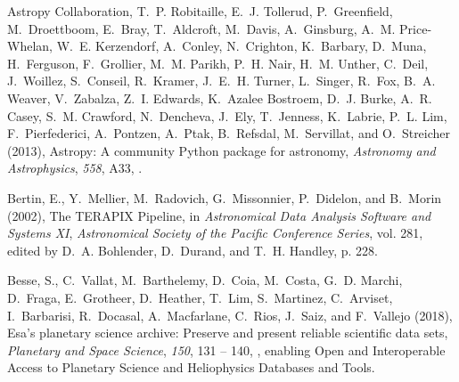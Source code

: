 \begin{thebibliography}{22}
{Astropy Collaboration}, T.~P. {Robitaille}, E.~J. {Tollerud}, P.~{Greenfield},
  M.~{Droettboom}, E.~{Bray}, T.~{Aldcroft}, M.~{Davis}, A.~{Ginsburg}, A.~M.
  {Price-Whelan}, W.~E. {Kerzendorf}, A.~{Conley}, N.~{Crighton}, K.~{Barbary},
  D.~{Muna}, H.~{Ferguson}, F.~{Grollier}, M.~M. {Parikh}, P.~H. {Nair}, H.~M.
  {Unther}, C.~{Deil}, J.~{Woillez}, S.~{Conseil}, R.~{Kramer}, J.~E.~H.
  {Turner}, L.~{Singer}, R.~{Fox}, B.~A. {Weaver}, V.~{Zabalza}, Z.~I.
  {Edwards}, K.~{Azalee Bostroem}, D.~J. {Burke}, A.~R. {Casey}, S.~M.
  {Crawford}, N.~{Dencheva}, J.~{Ely}, T.~{Jenness}, K.~{Labrie}, P.~L. {Lim},
  F.~{Pierfederici}, A.~{Pontzen}, A.~{Ptak}, B.~{Refsdal}, M.~{Servillat}, and
  O.~{Streicher} (2013), {Astropy: A community Python package for astronomy},
  \textit{Astronomy and Astrophysics}, \textit{558}, A33,
  .

{Bertin}, E., Y.~{Mellier}, M.~{Radovich}, G.~{Missonnier}, P.~{Didelon}, and
  B.~{Morin} (2002), {The TERAPIX Pipeline}, in \textit{Astronomical Data
  Analysis Software and Systems XI}, \textit{Astronomical Society of the
  Pacific Conference Series}, vol. 281, edited by D.~A. {Bohlender},
  D.~{Durand}, and T.~H. {Handley}, p. 228.

Besse, S., C.~Vallat, M.~Barthelemy, D.~Coia, M.~Costa, G.~D. Marchi, D.~Fraga,
  E.~Grotheer, D.~Heather, T.~Lim, S.~Martinez, C.~Arviset, I.~Barbarisi,
  R.~Docasal, A.~Macfarlane, C.~Rios, J.~Saiz, and F.~Vallejo (2018), Esa's
  planetary science archive: Preserve and present reliable scientific data
  sets, \textit{Planetary and Space Science}, \textit{150}, 131 -- 140,
  , enabling Open and
  Interoperable Access to Planetary Science and Heliophysics Databases and
  Tools.


\end{thebibliography}
